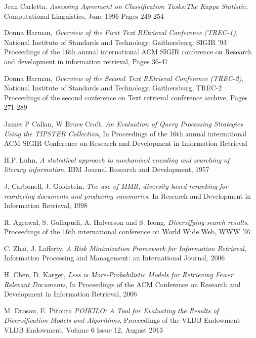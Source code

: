 \begin{thebibliography}{99}
		Jean Carletta,
			\emph{Assessing Agreement on Classification Tasks:The Kappa Statistic},
			Computational Linguistics,
			June 1996
			Pages 249-254

		Donna Harman,
		\emph{Overview of the First Text REtrieval Conference (TREC-1)},
		National Institute of Standards and Technology,
        Gaithersburg,
        SIGIR '93 Proceedings of the 16th annual international ACM SIGIR conference on Research and development in information retrieval,
		Pages 36-47

		Donna Harman,
		\emph{Overview of the Second Text REtrieval Conference (TREC-2)},
		National Institute of Standards and Technology,
        Gaithersburg,
		TREC-2 Proceedings of the second conference on Text retrieval conference archive,
		Pages 271-289

		James P Callan, W Bruce Croft,
		\emph{An Evaluation of Query Processing Strategies Using the TIPSTER Collection},
		In Proceedings of the 16th annual international ACM SIGIR Conference on Research and Development in Information Retrieval

		H.P. Luhn,
		\emph{A statistical approach to mechanized encoding and searching of literary information},
		IBM Journal Research and Development,
		1957

		J. Carbonell, J. Goldstein,
		\emph{The use of MMR, diversity-based reranking for reordering documents and producing summaries},
		In Research and Development in Information Retrieval,
		1998

		R. Agrawal, S. Gollapudi, A. Halverson and S. Ieong,
		\emph{Diversifying search results},
		Proceedings of the 16th international conference on World Wide Web,
		WWW '07

		C. Zhai, J. Lafferty,
		\emph{A Risk Minimization Framework for Information Retrieval},
		Information Processing and Management: an International Journal,
		2006

		H. Chen, D. Karger,
		\emph{Less is More-Probabilistic Models for Retrieving Fewer Relevant Documents},
		In Proceedings of the ACM Conference on Research and Development in Information Retrieval,
		2006


		M. Drosou, E. Pitoura
		\emph{POIKILO: A Tool for Evaluating the Results of Diversification Models and Algorithms},
		Proceedings of the VLDB Endowment VLDB Endowment,
		Volume 6 Issue 12, August 2013


\end{thebibliography}
